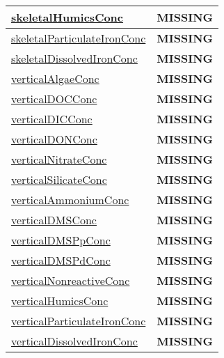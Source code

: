 {\begin{center}
\begin{longtable}{| p{2.0in} | p{4.0in} |}
    \hline
    \hyperref[subsec:var_sec_tracers_skeletalHumicsConc]{skeletalHumicsConc} & {\bf \color{red} MISSING} \\
    \hline
    \hyperref[subsec:var_sec_tracers_skeletalParticulateIronConc]{skeletalParticulateIronConc} & {\bf \color{red} MISSING} \\
    \hline
    \hyperref[subsec:var_sec_tracers_skeletalDissolvedIronConc]{skeletalDissolvedIronConc} & {\bf \color{red} MISSING} \\
    \hline
    \hyperref[subsec:var_sec_tracers_verticalAlgaeConc]{verticalAlgaeConc} & {\bf \color{red} MISSING} \\
    \hline
    \hyperref[subsec:var_sec_tracers_verticalDOCConc]{verticalDOCConc} & {\bf \color{red} MISSING} \\
    \hline
    \hyperref[subsec:var_sec_tracers_verticalDICConc]{verticalDICConc} & {\bf \color{red} MISSING} \\
    \hline
    \hyperref[subsec:var_sec_tracers_verticalDONConc]{verticalDONConc} & {\bf \color{red} MISSING} \\
    \hline
    \hyperref[subsec:var_sec_tracers_verticalNitrateConc]{verticalNitrateConc} & {\bf \color{red} MISSING} \\
    \hline
    \hyperref[subsec:var_sec_tracers_verticalSilicateConc]{verticalSilicateConc} & {\bf \color{red} MISSING} \\
    \hline
    \hyperref[subsec:var_sec_tracers_verticalAmmoniumConc]{verticalAmmoniumConc} & {\bf \color{red} MISSING} \\
    \hline
    \hyperref[subsec:var_sec_tracers_verticalDMSConc]{verticalDMSConc} & {\bf \color{red} MISSING} \\
    \hline
    \hyperref[subsec:var_sec_tracers_verticalDMSPpConc]{verticalDMSPpConc} & {\bf \color{red} MISSING} \\
    \hline
    \hyperref[subsec:var_sec_tracers_verticalDMSPdConc]{verticalDMSPdConc} & {\bf \color{red} MISSING} \\
    \hline
    \hyperref[subsec:var_sec_tracers_verticalNonreactiveConc]{verticalNonreactiveConc} & {\bf \color{red} MISSING} \\
    \hline
    \hyperref[subsec:var_sec_tracers_verticalHumicsConc]{verticalHumicsConc} & {\bf \color{red} MISSING} \\
    \hline
    \hyperref[subsec:var_sec_tracers_verticalParticulateIronConc]{verticalParticulateIronConc} & {\bf \color{red} MISSING} \\
    \hline
    \hyperref[subsec:var_sec_tracers_verticalDissolvedIronConc]{verticalDissolvedIronConc} & {\bf \color{red} MISSING} \\

\end{longtable}
\end{center}}
